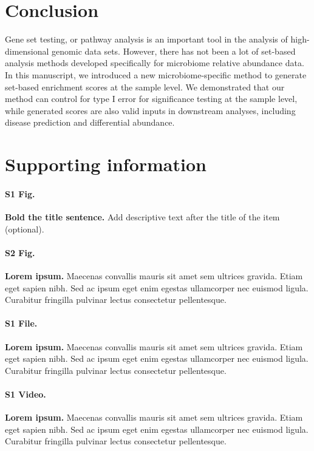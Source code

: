 \documentclass[10pt,letterpaper]{article}
\begin{document}
\section*{Conclusion}
Gene set testing, or pathway analysis is an important tool in the analysis of high-dimensional genomic data sets. However, there has not been a lot of set-based analysis methods developed specifically for microbiome relative abundance data. In this manuscript, we introduced a new microbiome-specific method to generate set-based enrichment scores at the sample level. We demonstrated that our method can control for type I error for significance testing at the sample level, while generated scores are also valid inputs in downstream analyses, including disease prediction and differential abundance. 


\section*{Supporting information}

\paragraph*{S1 Fig.}
\label{S1_Fig}
{\bf Bold the title sentence.} Add descriptive text after the title of the item (optional).

\paragraph*{S2 Fig.}
\label{S2_Fig}
{\bf Lorem ipsum.} Maecenas convallis mauris sit amet sem ultrices gravida. Etiam eget sapien nibh. Sed ac ipsum eget enim egestas ullamcorper nec euismod ligula. Curabitur fringilla pulvinar lectus consectetur pellentesque.

\paragraph*{S1 File.}
\label{S1_File}
{\bf Lorem ipsum.}  Maecenas convallis mauris sit amet sem ultrices gravida. Etiam eget sapien nibh. Sed ac ipsum eget enim egestas ullamcorper nec euismod ligula. Curabitur fringilla pulvinar lectus consectetur pellentesque.

\paragraph*{S1 Video.}
\label{S1_Video}
{\bf Lorem ipsum.}  Maecenas convallis mauris sit amet sem ultrices gravida. Etiam eget sapien nibh. Sed ac ipsum eget enim egestas ullamcorper nec euismod ligula. Curabitur fringilla pulvinar lectus consectetur pellentesque.
\end{document}
